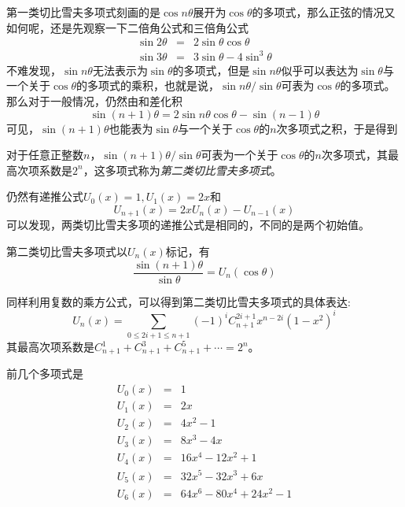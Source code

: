 第一类切比雪夫多项式刻画的是$\cos{n\theta}$展开为$\cos{\theta}$的多项式，那么正弦的情况又如何呢，还是先观察一下二倍角公式和三倍角公式
\begin{eqnarray*}
  \sin{2\theta} & = & 2\sin{\theta}\cos{\theta} \\
  \sin{3\theta} & = & 3\sin{\theta}-4\sin^3{\theta}
\end{eqnarray*}
不难发现，$\sin{n\theta}$无法表示为$\sin{\theta}$的多项式，但是$\sin{n\theta}$似乎可以表达为$\sin{\theta}$与一个关于$\cos{\theta}$的多项式的乘积，也就是说，$\sin{n\theta}/\sin{\theta}$可表为$\cos{\theta}$的多项式。那么对于一般情况，仍然由和差化积
\begin{equation*}
  \sin{(n+1)\theta}=2\sin{n\theta}\cos{\theta}-\sin{(n-1)\theta}
\end{equation*}
可见，$\sin{(n+1)\theta}$也能表为$\sin{\theta}$与一个关于$\cos{\theta}$的$n$次多项式之积，于是得到
\begin{theorem}
  对于任意正整数$n$，$\sin{(n+1)\theta}/\sin{\theta}$可表为一个关于$\cos{\theta}$的$n$次多项式，其最高次项系数是$2^n$，这多项式称为\emph{第二类切比雪夫多项式}。
\end{theorem}

仍然有递推公式$U_0(x)=1, U_1(x)=2x$和
\begin{equation*}
  U_{n+1}(x)=2xU_n(x)-U_{n-1}(x)
\end{equation*}
可以发现，两类切比雪夫多项的递推公式是相同的，不同的是两个初始值。

第二类切比雪夫多项式以$U_n(x)$标记，有
\begin{equation*}
  \frac{\sin{(n+1)\theta}}{\sin{\theta}} = U_n(\cos{\theta})
\end{equation*}

同样利用复数的乘方公式，可以得到第二类切比雪夫多项式的具体表达:
\begin{equation*}
  U_n(x) = \sum_{0 \leqslant 2i+1 \leqslant n+1}(-1)^iC_{n+1}^{2i+1}x^{n-2i}(1-x^2)^{i}
\end{equation*}
其最高次项系数是$C_{n+1}^1+C_{n+1}^3+C_{n+1}^5+\cdots=2^n$。

前几个多项式是
\begin{eqnarray*}
  U_0(x) & = & 1 \\
  U_1(x) & = & 2x \\
  U_2(x) & = & 4x^2-1 \\
  U_3(x) & = & 8x^3-4x \\
  U_4(x) & = & 16x^4-12x^2+1 \\
  U_5(x) & = & 32x^5-32x^3+6x \\
  U_6(x) & = & 64x^6-80x^4+24x^2-1
\end{eqnarray*}

